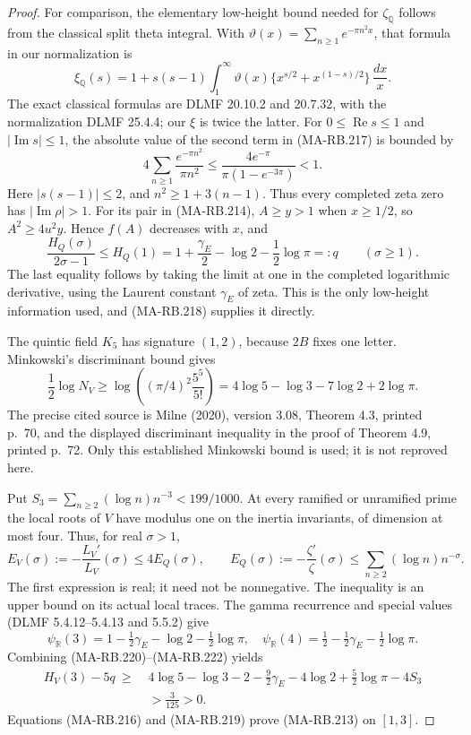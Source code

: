 \begin{proof}
For comparison, the elementary low-height bound needed for
\(\zeta_{\mathbb Q}\) follows from the classical split theta
integral. With \(\vartheta(x)=\sum_{n\ge1}e^{-\pi n^2x}\),
that formula in our normalization is
\[
 \xi_{\mathbb Q}(s)=1+s(s-1)
       \int_1^\infty\vartheta(x)
          \{x^{s/2}+x^{(1-s)/2}\}\,\frac{dx}{x}.
 \tag{MA-RB.217}
\]
The exact classical formulas are DLMF 20.10.2 and 20.7.32,
with the normalization DLMF 25.4.4; our \(\xi\) is twice
the latter. For \(0\le\operatorname{Re}s\le1\) and
\(|\operatorname{Im}s|\le1\), the absolute value of the
second term in (MA-RB.217) is bounded by
\[
 4\sum_{n\ge1}\frac{e^{-\pi n^2}}{\pi n^2}
       \le\frac{4e^{-\pi}}{\pi(1-e^{-3\pi})}<1.
 \tag{MA-RB.218}
\]
Here \(|s(s-1)|\le2\), and \(n^2\ge1+3(n-1)\).
Thus every completed zeta zero has \(|\operatorname{Im}\rho|>1\).
For its pair in (MA-RB.214), \(A\ge y>1\) when \(x\ge1/2\),
so \(A^2\ge4u^2y\). Hence \(f(A)\) decreases with \(x\), and
\[
 \frac{H_Q(\sigma)}{2\sigma-1}\le H_Q(1)
       =1+\frac{\gamma_{\!E}}2-\log2-\frac12\log\pi
       =:q\qquad(\sigma\ge1).
 \tag{MA-RB.219}
\]
The last equality follows by taking the limit at one in the
completed logarithmic derivative, using the Laurent constant
\(\gamma_{\!E}\) of zeta. This is the only low-height information
used, and (MA-RB.218) supplies it directly.

The quintic field \(K_5\) has signature \((1,2)\), because
\(2B\) fixes one letter. Minkowski's discriminant bound gives
\[
 \frac12\log N_V
    \ge\log\!\left((\pi/4)^2\frac{5^5}{5!}\right)
    =4\log5-\log3-7\log2+2\log\pi.
 \tag{MA-RB.220}
\]
The precise cited source is Milne (2020), version 3.08,
Theorem 4.3, printed p.~70, and the displayed discriminant
inequality in the proof of Theorem 4.9, printed p.~72.
Only this established Minkowski bound is used; it is not
reproved here.

Put \(S_3=\sum_{n\ge2}(\log n)n^{-3}<199/1000\).
At every ramified or unramified prime the local roots of
\(V\) have modulus one on the inertia invariants, of dimension
at most four. Thus, for real \(\sigma>1\),
\[
 E_V(\sigma):=-\frac{L_V'}{L_V}(\sigma)
       \le4E_Q(\sigma),\qquad
 E_Q(\sigma):=-\frac{\zeta'}\zeta(\sigma)
       \le\sum_{n\ge2}(\log n)n^{-\sigma}.
 \tag{MA-RB.221}
\]
The first expression is real; it need not be nonnegative.
The inequality is an upper bound on its actual local traces.
The gamma recurrence and special values (DLMF 5.4.12--5.4.13
and 5.5.2) give
\[
 \psi_{\mathbb R}(3)=1-\tfrac12\gamma_{\!E}-\log2-\tfrac12\log\pi,
 \quad
 \psi_{\mathbb R}(4)=\tfrac12-\tfrac12\gamma_{\!E}-\tfrac12\log\pi.
 \tag{MA-RB.222}
\]
Combining (MA-RB.220)--(MA-RB.222) yields
\[
 \begin{split}
 H_V(3)-5q\ \ge\;&4\log5-\log3-2
       -\tfrac92\gamma_{\!E}-4\log2+\tfrac52\log\pi-4S_3\\
 &>\frac3{125}>0.
 \end{split}
 \tag{MA-RB.223}
\]
Equations (MA-RB.216) and (MA-RB.219) prove (MA-RB.213)
on \([1,3]\).


\end{proof}
